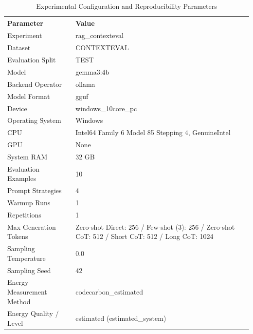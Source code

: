 \begin{table}
\caption{Experimental Configuration and Reproducibility Parameters}
\label{tab:experimental_configuration}
\begin{tabular}{ll}
\toprule
Parameter & Value \\
\midrule
Experiment & rag\_contexteval \\
Dataset & CONTEXTEVAL \\
Evaluation Split & TEST \\
Model & gemma3:4b \\
Backend Operator & ollama \\
Model Format & gguf \\
Device & windows\_10core\_pc \\
Operating System & Windows \\
CPU & Intel64 Family 6 Model 85 Stepping 4, GenuineIntel \\
GPU & None \\
System RAM & 32 GB \\
Evaluation Examples & 10 \\
Prompt Strategies & 4 \\
Warmup Runs & 1 \\
Repetitions & 1 \\
Max Generation Tokens & Zero-shot Direct: 256 / Few-shot (3): 256 / Zero-shot CoT: 512 / Short CoT: 512 / Long CoT: 1024 \\
Sampling Temperature & 0.0 \\
Sampling Seed & 42 \\
Energy Measurement Method & codecarbon\_estimated \\
Energy Quality / Level & estimated (estimated\_system) \\
\bottomrule
\end{tabular}
\end{table}
